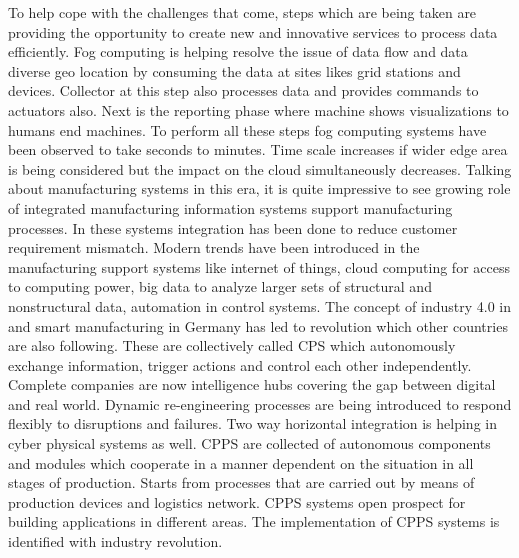 To help cope with the challenges that come, steps which are being taken are providing the opportunity to create new and innovative services to process data efficiently. Fog computing is helping resolve the issue of data flow and data diverse geo location by consuming the data at sites likes grid stations and devices. Collector at this step also processes data and provides commands to actuators also. Next is the reporting phase where machine shows visualizations to humans end machines. To perform all these steps fog computing systems have been observed to take seconds to minutes. Time scale increases if wider edge area is being considered but the impact on the cloud simultaneously decreases. Talking about manufacturing systems in this era, it is quite impressive to see growing role of integrated manufacturing information systems support manufacturing processes. In these systems integration has been done to reduce customer requirement mismatch. Modern trends have been introduced in the manufacturing support systems like internet of things, cloud computing for access to computing power, big data to analyze larger sets of structural and nonstructural data, automation in control systems. The concept of industry 4.0 in and smart manufacturing in Germany has led to revolution which other countries are also following. These are collectively called CPS which autonomously exchange information, trigger actions and control each other independently. Complete companies are now intelligence hubs covering the gap between digital and real world. Dynamic re-engineering processes are being introduced to respond flexibly to disruptions and failures. Two way horizontal integration is helping in cyber physical systems as well. CPPS are collected of autonomous components and modules which cooperate in a manner dependent on the situation in all stages of production. Starts from processes that are carried out by means of production devices and logistics network. CPPS systems open prospect for building applications in different areas. The implementation of CPPS systems is identified with industry revolution.

